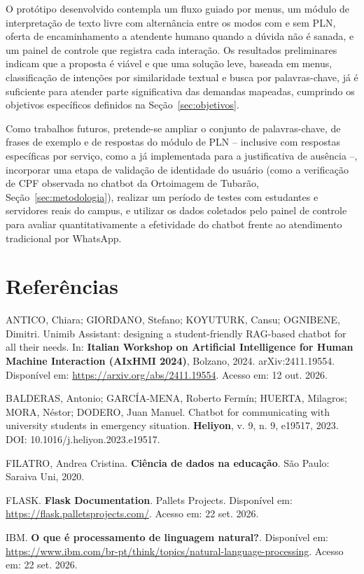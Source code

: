 \documentclass[12pt]{article}
\begin{document}
O protótipo desenvolvido contempla um fluxo guiado por menus, um módulo
de interpretação de texto livre com alternância entre os modos com e sem
PLN, oferta de encaminhamento a atendente humano quando a dúvida não é sanada, e um
painel de controle que registra cada interação. Os resultados
preliminares indicam que a proposta é viável e que uma solução leve,
baseada em menus, classificação de intenções por similaridade textual e busca por palavras-chave, já é suficiente para
atender parte significativa das demandas mapeadas, cumprindo os
objetivos específicos definidos na Seção~\ref{sec:objetivos}.

Como trabalhos futuros, pretende-se ampliar o conjunto de palavras-chave, de frases de exemplo e de respostas do módulo de PLN -- inclusive com respostas específicas por serviço, como a já implementada para a justificativa de ausência --, incorporar uma etapa de validação de
identidade do usuário (como a verificação de CPF observada no chatbot da
Ortoimagem de Tubarão, Seção~\ref{sec:metodologia}), realizar um período de testes com
estudantes e servidores reais do campus, e utilizar os dados coletados
pelo painel de controle para avaliar quantitativamente a efetividade do
chatbot frente ao atendimento tradicional por WhatsApp.

\section{Referências}

ANTICO, Chiara; GIORDANO, Stefano; KOYUTURK, Cansu; OGNIBENE, Dimitri.
Unimib Assistant: designing a student-friendly RAG-based chatbot for all
their needs. In: \textbf{Italian Workshop on Artificial Intelligence for
Human Machine Interaction (AIxHMI 2024)}, Bolzano, 2024. arXiv:2411.19554.
Disponível em: \url{https://arxiv.org/abs/2411.19554}. Acesso em: 12 out.
2026.

BALDERAS, Antonio; GARCÍA-MENA, Roberto Fermín; HUERTA, Milagros; MORA,
Néstor; DODERO, Juan Manuel. Chatbot for communicating with university
students in emergency situation. \textbf{Heliyon}, v. 9, n. 9, e19517,
2023. DOI: 10.1016/j.heliyon.2023.e19517.

FILATRO, Andrea Cristina. \textbf{Ciência de dados na educação}. São
Paulo: Saraiva Uni, 2020.

FLASK. \textbf{Flask Documentation}. Pallets Projects. Disponível em:
\url{https://flask.palletsprojects.com/}. Acesso em: 22 set. 2026.

IBM. \textbf{O que é processamento de linguagem natural?}. Disponível em:
\url{https://www.ibm.com/br-pt/think/topics/natural-language-processing}.
Acesso em: 22 set. 2026.
\end{document}
